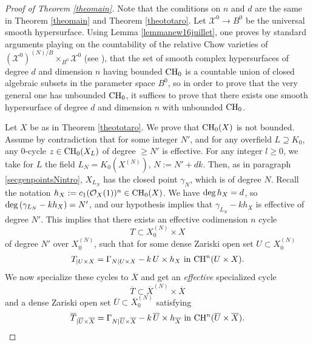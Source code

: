 \documentclass[10pt]{article}
\begin{document}
\begin{proof}[Proof of Theorem \ref{theomain}]
Note that the conditions on $n$ and $d$ are the same in Theorem \ref{theomain} and Theorem \ref{theototaro}. Let $\mathcal{X}^0\rightarrow B^0$ be the universal smooth hypersurface. Using Lemma \ref{lemmanew16juillet}, one proves by standard arguments playing on the countability of the relative Chow varieties of $(\mathcal{X}^0)^{(N)/B}\times_{B^0} \mathcal{X}^0$ (see \cite{voisininvent}), that  the set of smooth complex hypersurfaces of degree $d$ and dimension $n$ having  bounded ${\rm CH}_0$  is a  countable union of closed algebraic subsets in the parameter space $B^0$, so in order to prove that the very general one has unbounded ${\rm CH}_0$, it suffices to prove that there exists one smooth hypersurface of degree $d$ and dimension $n$ with unbounded ${\rm CH}_0$.

 Let $X$ be as in Theorem  \ref{theototaro}. We  prove that ${\rm CH}_0(X)$ is not bounded. Assume by contradiction that for some integer $N'$, and for any overfield $L\supseteq K_0$, any $0$-cycle $z\in{\rm CH}_0(X_L)$ of degree $\geq N'$ is effective. For any integer $l\geq 0$, we take for $L$ the field $L_{N}=K_0(X^{(N)})$, $N:=N'+dk$. Then, as in paragraph \ref{secgenpointsNintro}, $X_{L_N}$ has  the  closed point $\gamma_{N}$, which is of degree $N$.
Recall the notation $h_X:=c_1(\mathcal{O}_X(1))^n\in {\rm CH}_0(X)$. We have ${\rm deg}\,h_X=d$, so
${\rm deg}\,(\gamma_{L_N}-kh_X)=N'$, and  our hypothesis implies that $\gamma_{L_N}-kh_X$ is effective of degree $N'$. This implies that there exists an effective  codimension $n$ cycle
$$T\subset X^{(N)}_0\times X$$
of degree $N'$ over $X^{(N)}_0$, such that for some dense Zariski open set $U\subset X^{(N)}_0$
\begin{eqnarray}\label{eqnpourrelzerocycleNd}
T_{\mid U\times X}=\Gamma_{N\mid U\times X}- k\, U\times h_X\,\,{\rm in}\,\,{\rm CH}^n(U\times X).
\end{eqnarray}
We now specialize these cycles to $\overline{X}$ and get an {\it effective}  specialized cycle $$\overline{T}\subset \overline{X}^{(N)}\times \overline{X}$$ and a dense Zariski open set $\overline{U}\subset  \overline{X}^{(N)}_0$ satisfying
\begin{eqnarray}\label{eqnpourrelzerocycleNdbar}
\overline{T}_{\mid \overline{U}\times \overline{X}}=\Gamma_{N\mid \overline{U}\times \overline{X}}- k\,\overline{U}\times h_{\overline{X}}\,\,{\rm in}\,\,{\rm CH}^n(\overline{U}\times \overline{X}).
\end{eqnarray}


\end{proof}
\end{document}
